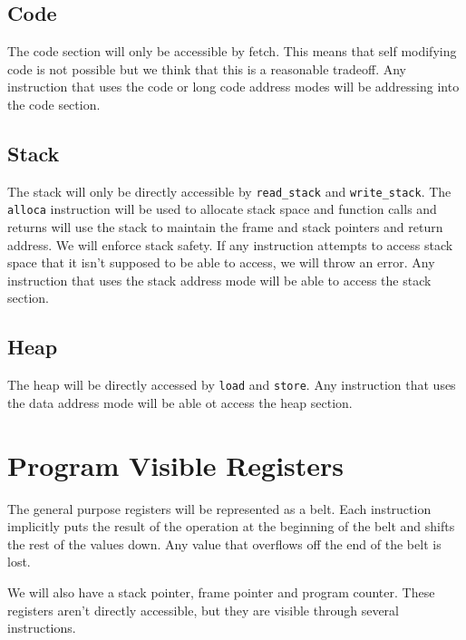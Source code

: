 \documentclass{article}
\begin{document}
	\subsection*{Code}

		The code section will only be accessible by fetch.
		This means that self modifying code is not possible but we think that this is a reasonable tradeoff.
		Any instruction that uses the code or long code address modes will be addressing into the code section.

	\subsection*{Stack}

		The stack will only be directly accessible by \texttt{read\_stack} and \texttt{write\_stack}.
		The \texttt{alloca} instruction will be used to allocate stack space and function calls and returns will use the stack to maintain the frame and stack pointers and return address.
		We will enforce stack safety. If any instruction attempts to access stack space that it isn't supposed to be able to access, we will throw an error.
		Any instruction that uses the stack address mode will be able to access the stack section.

	\subsection*{Heap}

		The heap will be directly accessed by \texttt{load} and \texttt{store}.
		Any instruction that uses the data address mode will be able ot access the heap section.

\section{Program Visible Registers}

	The general purpose registers will be represented as a belt.
	Each instruction implicitly puts the result of the operation at the beginning of the belt and shifts the rest of the values down.
	Any value that overflows off the end of the belt is lost.

	We will also have a stack pointer, frame pointer and program counter.
	These registers aren't directly accessible, but they are visible through several instructions.
\end{document}

